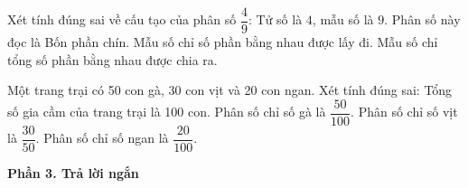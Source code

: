 \begin{ex} %
Xét tính đúng sai về cấu tạo của phân số $\dfrac{4}{9}$:
\choiceTF
{\True Tử số là $4$, mẫu số là $9$.}
{\True Phân số này đọc là Bốn phần chín.}
{Mẫu số chỉ số phần bằng nhau được lấy đi.}
{\True Mẫu số chỉ tổng số phần bằng nhau được chia ra.}
\end{ex}

\begin{ex} %
Một trang trại có 50 con gà, 30 con vịt và 20 con ngan. Xét tính đúng sai:
\choiceTF
{\True Tổng số gia cầm của trang trại là 100 con.}
{\True Phân số chỉ số gà là $\dfrac{50}{100}$.}
{Phân số chỉ số vịt là $\dfrac{30}{50}$.}
{\True Phân số chỉ số ngan là $\dfrac{20}{100}$.}
\end{ex}

\textbf{Phần 3. Trả lời ngắn}

